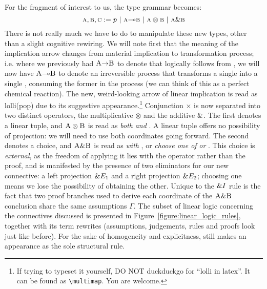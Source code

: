 For the fragment of interest to us, the type grammar becomes:
\begin{equation}
\prop{a}, \prop{b}, \prop{c} := p \ | \ \prop{a} \li \prop{b} \ | \ \prop{a} \otimes \prop{b} \ | \ \prop{a} \with \prop{b} 
\label{equation:ILL}
\end{equation}
There is not really much we have to do to manipulate these new types, other than a slight cognitive rewiring.
We will note first that the meaning of the implication arrow changes from material implication to transformation process; i.e. where we previously had $\smallprop{A} \ii \smallprop{B}$ to denote that  logically follows from , we will now have $\smallprop{A} \li \smallprop{B}$ to denote an irreversible process that transforms a single  into a single , consuming the former in the process (we can think of this as a perfect chemical reaction).
The new, weird-looking arrow of linear implication is read as lolli(pop) due to its suggestive appearance.\footnote{If trying to typeset it yourself, DO NOT duckduckgo for ``lolli in latex''. It can be found as \texttt{\textbackslash multimap}. You are welcome.}
Conjunction $\times$ is now separated into two distinct operators, the multiplicative $\otimes$ and the additive ${\&}$. 
The first denotes a linear tuple, and $\normalfont\textsc{A} \otimes \normalfont\textsc{B}$ is read as \textit{both}  \textit{and} .
A linear tuple offers no possibility of projection: we will need to use both coordinates going forward.
The second denotes a choice, and $\normalfont\textsc{A} {\ensuremath{\&}} \normalfont\textsc{B}$ is read as  \textit{with} , or \textit{choose one of} \textit{or} .
This choice is \textit{external}, as the freedom of applying it lies with the operator rather than the proof, and is manifested by the presence of two eliminators for our new connective: a left projection ${\&} E_1$ and a right projection ${\&} E_2$; choosing one means we lose the possibility of obtaining the other.
Unique to the ${\&} I$ rule is the fact that two proof branches used to derive each coordinate of the $\normalfont\textsc{A} {\ensuremath{\&}} \normalfont\textsc{B}$ conclusion share the same assumptions $\Gamma$.
The subset of linear logic concerning the connectives discussed is presented in Figure~\ref{figure:linear_logic_rules}, together with its term rewrites (assumptions, judgements, rules and proofs look just like before).
For the sake of homogeneity and explicitness, \Exchange{} still makes an appearance as the sole structural rule.


